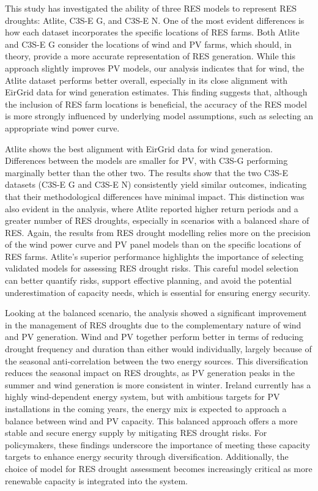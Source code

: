 \documentclass[a4paper, 11p1t]{article}
\begin{document}
This study has investigated the ability of three RES models to represent RES droughts: Atlite, C3S-E G, and C3S-E N. One of the most evident differences is how each dataset incorporates the specific locations of RES farms. Both Atlite and C3S-E G consider the locations of wind and PV farms, which should, in theory, provide a more accurate representation of RES generation. While this approach slightly improves PV models, our analysis indicates that for wind, the Atlite dataset performs better overall, especially in its close alignment with EirGrid data for wind generation estimates. This finding suggests that, although the inclusion of RES farm locations is beneficial, the accuracy of the RES model is more strongly influenced by underlying model assumptions, such as selecting an appropriate wind power curve.

Atlite shows the best alignment with EirGrid data for wind generation. Differences between the models are smaller for PV, with C3S-G performing marginally better than the other two. The results show that the two C3S-E datasets (C3S-E G and C3S-E N) consistently yield similar outcomes, indicating that their methodological differences have minimal impact. This distinction was also evident in the analysis, where Atlite reported higher return periods and a greater number of RES droughts, especially in scenarios with a balanced share of RES. Again, the results from RES drought modelling relies more on the precision of the wind power curve and PV panel models than on the specific locations of RES farms. Atlite’s superior performance highlights the importance of selecting validated models for assessing RES drought risks. This careful model selection can better quantify risks, support effective planning, and avoid the potential underestimation of capacity needs, which is essential for ensuring energy security.

Looking at the balanced scenario, the analysis showed a significant improvement in the management of RES droughts due to the complementary nature of wind and PV generation. Wind and PV together perform better in terms of reducing drought frequency and duration than either would individually, largely because of the seasonal anti-correlation between the two energy sources. This diversification reduces the seasonal impact on RES droughts, as PV generation peaks in the summer and wind generation is more consistent in winter. Ireland currently has a highly wind-dependent energy system, but with ambitious targets for PV installations in the coming years, the energy mix is expected to approach a balance between wind and PV capacity. This balanced approach offers a more stable and secure energy supply by mitigating RES drought risks. For policymakers, these findings underscore the importance of meeting these capacity targets to enhance energy security through diversification. Additionally, the choice of model for RES drought assessment becomes increasingly critical as more renewable capacity is integrated into the system.
\end{document}
